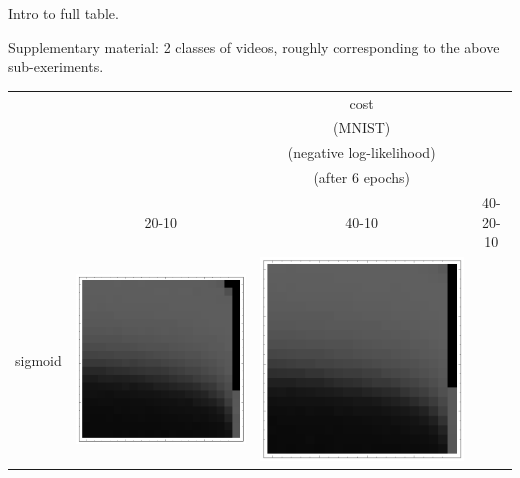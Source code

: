 \documentclass[10pt]{article}
\begin{document}
Intro to full table.

Supplementary material: 2 classes of videos, roughly corresponding to
the above sub-exeriments.

\begin{tabular}{|c|c|c|c|}
        \hline
        & & {\LARGE cost} & \\
        & & (MNIST) & \\
        & & (negative log-likelihood) & \\
        & & (after 6 epochs) & \\
        \hline
         & 20-10 & 40-10 & 40-20-10\\ \hline
sigmoid 
        & \includegraphics[scale=0.25]{plots/simple/LF-20S10S-20T10-MNIST-6.png}
        & \includegraphics[scale=0.25]{plots/simple/LF-40S10S-20T10-MNIST-6.png}

\end{tabular}
\end{document}

